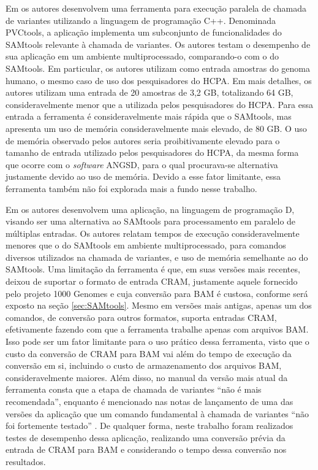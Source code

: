 \documentclass[cic,tc]{iiufrgs}
\begin{document}
Em \cite{jin2019pvctools} os autores desenvolvem uma ferramenta para execução
paralela de chamada de variantes utilizando a linguagem de programação C++.
Denominada PVCtools, a aplicação implementa um subconjunto de funcionalidades
do SAMtools relevante à chamada de variantes. Os autores testam o desempenho de
sua aplicação em um ambiente multiprocessado, comparando-o com o do SAMtools.
Em particular, os autores utilizam como entrada amostras do genoma humano,
o mesmo caso de uso dos pesquisadores do HCPA. Em mais detalhes, os
autores utilizam uma entrada de 20 amostras de 3,2 GB, totalizando 64 GB,
consideravelmente menor que a utilizada pelos pesquisadores do HCPA. Para essa
entrada a ferramenta é consideravelmente mais rápida que o SAMtools, mas
apresenta um uso de memória consideravelmente mais elevado, de 80 GB. O uso de
memória observado pelos autores seria proibitivamente elevado para o tamanho de
entrada utilizado pelos pesquisadores do HCPA, da mesma forma que ocorre com o
\textit{software} ANGSD, para o qual procurava-se alternativa justamente devido ao uso
de memória. Devido a esse fator limitante, essa ferramenta também não foi
explorada mais a fundo nesse trabalho.

Em \cite{tarasov2015sambamba} os autores desenvolvem uma aplicação, na
linguagem de programação D, visando ser uma alternativa ao SAMtools para
processamento em paralelo de múltiplas entradas. Os autores relatam tempos de
execução consideravelmente menores que o do SAMtools em ambiente
multiprocessado, para comandos diversos utilizados na chamada de variantes, e
uso de memória semelhante ao do SAMtools. Uma limitação da ferramenta é que, em
suas versões mais recentes, deixou de suportar o formato de entrada CRAM,
justamente aquele fornecido pelo projeto 1000 Genomes e cuja conversão para BAM é
custosa, conforme será exposto na seção \ref{sec:SAMtools}. Mesmo em versões
mais antigas, apenas um dos comandos, de conversão para outros formatos,
suporta entradas CRAM, efetivamente fazendo com que a ferramenta trabalhe
apenas com arquivos BAM. Isso pode ser um fator limitante para o uso prático
dessa ferramenta, visto que o custo da conversão de CRAM para BAM vai além do
tempo de execução da conversão em si, incluindo o custo de armazenamento dos
arquivos BAM, consideravelmente maiores. Além disso, no manual da versão mais
atual da ferramenta consta que a etapa de chamada de variantes ``não é mais
recomendada'', enquanto é mencionado nas notas de lançamento de uma das versões
da aplicação que um comando fundamental à chamada de variantes ``não foi
fortemente testado'' \cite{manual2015sambamba}. De qualquer forma, neste
trabalho foram realizados testes de desempenho dessa aplicação, realizando uma
conversão prévia da entrada de CRAM para BAM e considerando o tempo dessa
conversão nos resultados.
\end{document}
